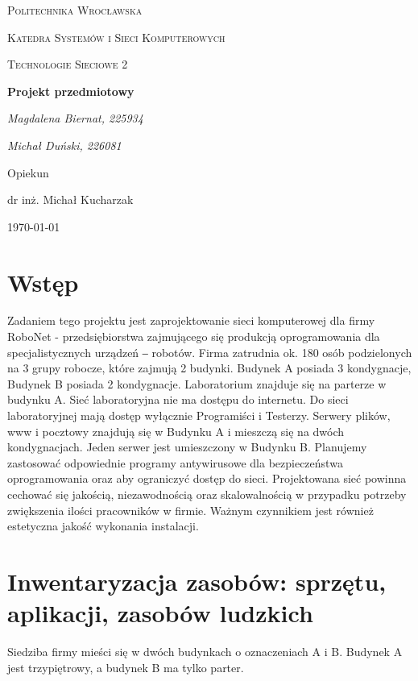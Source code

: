 \documentclass{article}
\begin{document}
	
	\begin{titlepage}
		\centering
		{\scshape\LARGE Politechnika Wrocławska \par}
		{\scshape\Large Katedra Systemów i Sieci Komputerowych \par}
		
		\vspace{1cm}
		{\scshape\Large Technologie Sieciowe 2\par}
		\vspace{5cm}
		{\huge\bfseries Projekt przedmiotowy\par}
		\vspace{5cm}
		{\Large\itshape Magdalena Biernat, 225934\par}
		{\Large\itshape Michał Duński, 226081\par}
		\vfill
		Opiekun\par
		dr inż. Michał Kucharzak 
		
		\vfill
		{\large \today\par}
	\end{titlepage}
	\newpage
	\section{Wstęp}
	 Zadaniem tego projektu jest zaprojektowanie sieci komputerowej dla firmy RoboNet - przedsiębiorstwa zajmującego się produkcją oprogramowania dla specjalistycznych urządzeń ‒ robotów. Firma zatrudnia ok. 180 osób podzielonych na 3 grupy robocze, które zajmują 2 budynki. Budynek A posiada 3 kondygnacje, Budynek B posiada 2 kondygnacje. Laboratorium znajduje się na parterze w budynku A. Sieć laboratoryjna nie ma dostępu do internetu. Do sieci laboratoryjnej mają dostęp wyłącznie Programiści i Testerzy. Serwery plików, www i pocztowy znajdują się w Budynku A i mieszczą się na dwóch kondygnacjach. Jeden serwer jest umieszczony w Budynku B.\newline
	 \noindent
	 \newline
Planujemy zastosować odpowiednie programy antywirusowe dla bezpieczeństwa oprogramowania oraz aby ograniczyć dostęp do sieci.
\newline
\noindent
\newline
	Projektowana sieć powinna cechować się jakością, niezawodnością oraz skalowalnością w przypadku potrzeby zwiększenia ilości pracowników w firmie. Ważnym czynnikiem jest również estetyczna jakość wykonania instalacji.
\newpage
\section{Inwentaryzacja zasobów: sprzętu, aplikacji, zasobów ludzkich}
Siedziba firmy mieści się w dwóch budynkach o oznaczeniach A i B. Budynek A jest trzypiętrowy, a budynek B ma tylko parter. 
\end{document}
